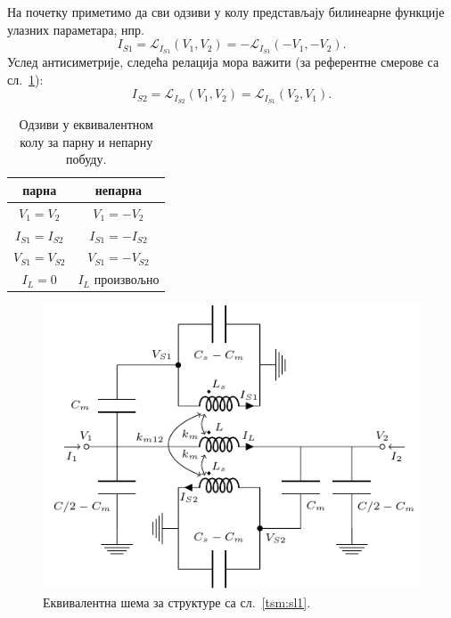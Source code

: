 \documentclass[main.tex]{subfiles}
\begin{document}
На почетку приметимо да сви одзиви у колу представљају билинеарне функције улазних параметара, нпр.
\begin{equation}
I_{S1} = \mathcal{L}_{I_{S1}}(V_1,V_2) = -\mathcal{L}_{I_{S1}}(-V_1,-V_2).
\label{tsm:blin1}\end{equation}
Услед антисиметрије, следећа релација мора важити (за референтне смерове са сл.~\ref{tsm:sl3}):
\begin{equation}
    I_{S2}=\mathcal{L}_{I_{S2}}(V_1,V_2)=\mathcal{L}_{I_{S1}}(V_2,V_1).
\label{tsm:blin2}\end{equation}
\begin{table}[!t]
\renewcommand{\arraystretch}{1.3}
\caption{Одзиви у еквивалентном колу за парну и непарну побуду.}
\label{tsm:tabela_uslovi}
\centering
\begin{tabular}{|c|c|}
\hline
парна & непарна \\
\hline
$V_1 = V_2$ & $V_1 = -V_2$ \\
\hline
$I_{S1} = I_{S2}$ & $I_{S1} = -I_{S2}$ \\
\hline
$V_{S1} = V_{S2}$ & $V_{S1} = -V_{S2}$ \\
\hline
$I_L = 0$ & $I_L$ произвољно\\
\hline
\end{tabular}
\end{table}
\begin{figure}
    \begin{center}
        \includegraphics[scale=1]{sl_tsm/sl3.pdf}
    \caption{Еквивалентна шема за структуре са сл.~\ref{tsm:sl1}.}
    \label{tsm:sl3}
  \end{center}
\end{figure}
\end{document}
